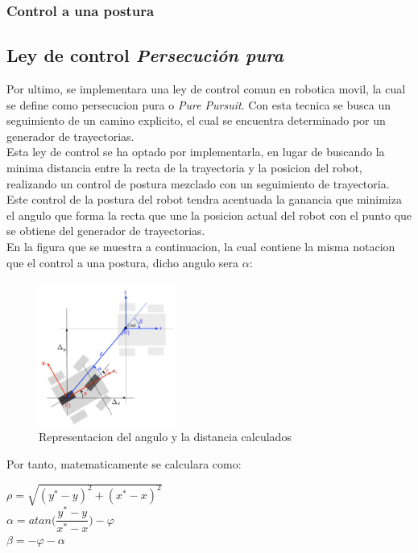 \documentclass[a4paper,twoside]{article}
\begin{document}
	\subsubsection{Control a una postura}

\newpage

\subsection{Ley de control \textit{Persecución pura}}
Por ultimo, se implementara una ley de control comun en robotica movil, la cual se define como persecucion pura o \textit{Pure Pursuit}. Con esta tecnica se busca un seguimiento de un camino explicito, el cual se encuentra determinado por un generador de trayectorias.\\
Esta ley de control se ha optado por implementarla, en lugar de buscando la minima distancia entre la recta de la trayectoria y la posicion del robot, realizando un control de postura mezclado con un seguimiento de trayectoria. \\
Este control de la postura del robot tendra acentuada la ganancia que minimiza el angulo que forma la recta que une la posicion actual del robot con el punto que se obtiene del generador de trayectorias.\\
En la figura que se muestra a continuacion, la cual contiene la misma notacion que el control a una postura, dicho angulo sera $\alpha$:

\begin{figure}[h!]
   \centering
   \includegraphics[width=0.4\textwidth]{postura}
   \caption{Representacion del angulo y la distancia calculados}
\end{figure}

Por tanto, matematicamente se calculara como:
\begin{center}
$\rho=\sqrt{(y^*-y)^2+(x^*-x)^2}$ \\
$\alpha=atan\Big(\dfrac{y^*-y}{x^*-x}\Big)-\varphi$ \\
$\beta=-\varphi-\alpha$
\end{center}
\end{document}
